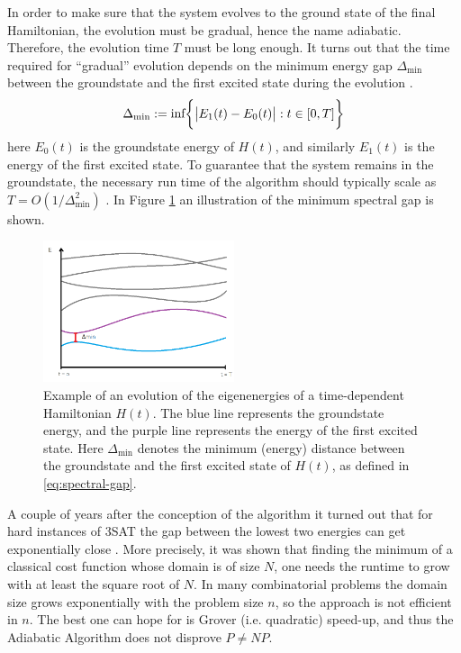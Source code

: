 In order to make sure that the system evolves to the ground state of the final Hamiltonian, the evolution must be gradual, hence the name adiabatic. Therefore, the evolution time $T$ must be long enough. It turns out that the time required for ``gradual'' evolution depends on the minimum energy gap $\Delta_{\min}$ between the groundstate and the first excited state during the evolution \cite{DMV02}.
\begin{equation}
	\Delta_{\min} := \text{inf}\bigg\{\big|E_1(t)-E_0(t)\big|: t \in [0,T]\bigg\}
	\label{eq:spectral-gap}
\end{equation}
here $E_0(t)$ is the groundstate energy of $H(t)$, and similarly $E_1(t)$ is the energy of the first excited state. To guarantee that the system remains in the groundstate, the necessary run time of the algorithm should typically scale as $T = O(1/\Delta_{\min}^2)$ \cite{AL18, ZWCPL18}. In Figure \ref{fig:spectral-gap} an illustration of the minimum spectral gap is shown.
\begin{figure}[H]
	\centering
	\includegraphics[width=0.5\textwidth]{figures/spectralGap.png}
	\caption{Example of an evolution of the eigenenergies of a time-dependent Hamiltonian $H(t)$. The {\color{cyan}blue} line represents the groundstate energy, and the {\color{purple}purple} line represents the energy of the first excited state. Here $\Delta_{\min}$ denotes the minimum (energy) distance between the groundstate and the first excited state of $H(t)$, as defined in \eqref{eq:spectral-gap}.}
	\label{fig:spectral-gap}
\end{figure}
A couple of years after the conception of the algorithm it turned out that for hard instances of 3SAT the gap between the lowest two energies can get exponentially close \cite{FGGN2005}. More precisely, it was shown that finding the minimum of a classical cost function whose domain is of size $N$, one needs the runtime to grow with at least the square root of $N$. In many combinatorial problems the domain size grows exponentially with the problem size $n$, so the approach is not efficient in $n$. The best one can hope for is Grover  (i.e. quadratic) speed-up, and thus the Adiabatic Algorithm does not disprove $P \neq NP$.


